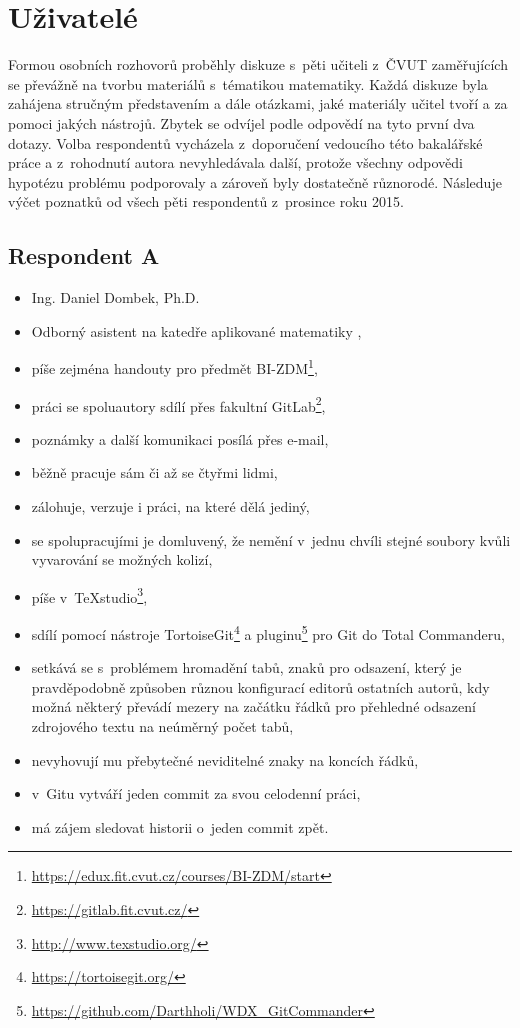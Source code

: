 \section{Uživatelé}

Formou osobních rozhovorů proběhly diskuze s~pěti učiteli z~ČVUT zaměřujících se převážně na tvorbu materiálů s~tématikou matematiky. Každá diskuze byla zahájena stručným představením a dále otázkami, jaké materiály učitel tvoří a za pomoci jakých nástrojů. Zbytek se odvíjel podle odpovědí na tyto první dva dotazy. Volba respondentů vycházela z~doporučení vedoucího této bakalářské práce a z~rohodnutí autora nevyhledávala další, protože všechny odpovědi hypotézu problému podporovaly a zároveň byly dostatečně různorodé. Následuje výčet poznatků od všech pěti respondentů z~prosince roku 2015.

\subsection{Respondent A}

\begin{itemize}
	\item Ing. Daniel Dombek, Ph.D.
	\item Odborný asistent na katedře aplikované matematiky \cite{kam},
	\item píše zejména handouty pro předmět BI-ZDM\footnote{\url{https://edux.fit.cvut.cz/courses/BI-ZDM/start}},
	\item práci se spoluautory sdílí přes fakultní GitLab\footnote{\url{https://gitlab.fit.cvut.cz/}},
	\item poznámky a další komunikaci posílá přes e-mail,
	\item běžně pracuje sám či až se čtyřmi lidmi,
	\item zálohuje, verzuje i práci, na které dělá jediný,
	\item se spolupracujími je domluvený, že nemění v~jednu chvíli stejné soubory kvůli vyvarování se možných kolizí,
	\item píše v~TeXstudio\footnote{\url{http://www.texstudio.org/}},
	\item sdílí pomocí nástroje TortoiseGit\footnote{\url{https://tortoisegit.org/}} a pluginu\footnote{\url{https://github.com/Darthholi/WDX\_GitCommander}} pro Git do Total Commanderu,
	\item setkává se s~problémem hromadění tabů, znaků pro odsazení, který je pravděpodobně způsoben různou konfigurací editorů ostatních autorů, kdy možná některý převádí mezery na začátku řádků pro přehledné odsazení zdrojového textu na neúměrný počet tabů,
	\item nevyhovují mu přebytečné neviditelné znaky na koncích řádků,
	\item v~Gitu vytváří jeden commit za svou celodenní práci,
	\item má zájem sledovat historii o~jeden commit zpět.
\end{itemize}


